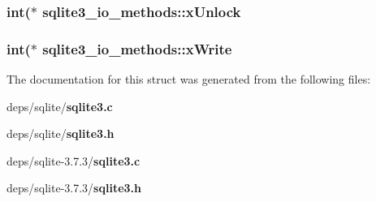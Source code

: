 \subsubsection{\setlength{\rightskip}{0pt plus 5cm}int($\ast$ \bf{sqlite3\_\-io\_\-methods::x\-Unlock}}\label{structsqlite3__io__methods_9ee09024b0d79d911c1fd1f6dc796182}


\subsubsection{\setlength{\rightskip}{0pt plus 5cm}int($\ast$ \bf{sqlite3\_\-io\_\-methods::x\-Write}}\label{structsqlite3__io__methods_536d5f0501f11a9afe914455780b2697}




The documentation for this struct was generated from the following files:\begin{CompactItemize}
\item 
deps/sqlite/\bf{sqlite3.c}\item 
deps/sqlite/\bf{sqlite3.h}\item 
deps/sqlite-3.7.3/\bf{sqlite3.c}\item 
deps/sqlite-3.7.3/\bf{sqlite3.h}\end{CompactItemize}
